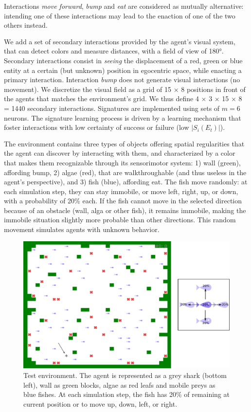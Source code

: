 \documentclass[conference]{IEEEtran}
\begin{document}
Interactions \textit{move forward}, \textit{bump} and \textit{eat} are considered as mutually alternative: intending one of these interactions may lead to the enaction of one of the two others instead.

We add a set of secondary interactions provided by the agent’s visual system, that can detect colors and measure distances, with a field of view of 180°.
Secondary interactions consist in \textit{seeing} the displacement of a red, green or blue entity at a certain (but unknown) position in egocentric space, while enacting a primary interaction.
Interaction \textit{bump} does not generate visual interactions (no movement).
We discretize the visual field as a grid of 15 × 8 positions in front of the agents that matches the environment's grid.
We thus define 4 × 3 × 15 × 8 = 1440 secondary interactions.
Signatures are implemented using sets of $m=6$ neurons.
The signature learning process is driven by a learning mechanism that foster interactions with low certainty of success or failure (low $|S_i(E_t)|$).

The environment contains three types of objects offering spatial regularities that the agent can discover by interacting with them, and characterized by a color that makes them recognizable through its sensorimotor system: 1) wall (green), affording bump, 2) algae (red), that are walkthroughable (and thus useless in the agent's perspective), and 3) fish (blue), affording eat.
The fish move randomly: at each simulation step, they can stay immobile, or move left, right, up, or down, with a probability of 20\% each.
If the fish cannot move in the selected direction because of an obstacle (wall, alga or other fish), it remains immobile, making the immobile situation slightly more probable than other directions. This random movement simulates agents with unknown behavior.

\begin{figure}[htbp]
\centerline{\includegraphics[scale=0.28]{img/environment.pdf}}
\caption{Test environment. The agent is represented as a grey shark (bottom left), wall as green blocks, algae as red leafs and mobile preys as blue fishes. At each simulation step, the fish has 20\% of remaining at current position or to move up, down, left, or right.
}
\label{fig:environment}
\end{figure}
\end{document}

